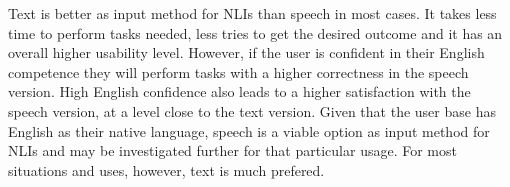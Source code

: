 Text is better as input method for NLIs than speech in most cases. It takes less time to perform tasks needed, less tries to get the desired outcome and it has an overall higher usability level. However, if the user is confident in their English competence they will perform tasks with a higher correctness in the speech version. High English confidence also leads to a higher satisfaction with the speech version, at a level close to the text version. Given that the user base has English as their native language, speech is a viable option as input method for NLIs and may be investigated further for that particular usage. For most situations and uses, however, text is much prefered.